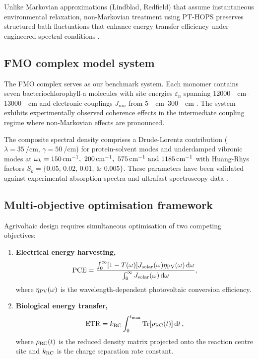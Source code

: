 Unlike Markovian approximations (Lindblad, Redfield) that assume instantaneous environmental relaxation, non-Markovian treatment using PT-HOPS preserves structured bath fluctuations that enhance energy transfer efficiency under engineered spectral conditions \cite{Scholes2011, Huelga2013}.

\subsection{FMO complex model system}

The FMO complex serves as our benchmark system. Each monomer contains seven bacteriochlorophyll-a molecules with site energies $\varepsilon_n$ spanning \SIrange{12000}{13000}{\per\centi\meter} and electronic couplings $J_{nm}$ from \SIrange{5}{300}{\per\centi\meter} \cite{Adolphs2006}. The system exhibits experimentally observed coherence effects \cite{Engel2007} in the intermediate coupling regime where non-Markovian effects are pronounced.

The composite spectral density comprises a Drude-Lorentz contribution ($\lambda = \SI{35}{\per\centi\meter}$, $\gamma = \SI{50}{\per\centi\meter}$) for protein-solvent modes and underdamped vibronic modes at $\omega_k = \SIlist{150;200;575;1185}{\per\centi\meter}$ with Huang-Rhys factors $S_k = \{\numlist{0.05; 0.02; 0.01; 0.005}\}$. These parameters have been validated against experimental absorption spectra and ultrafast spectroscopy data \cite{Adolphs2006, Moix2011}.

\subsection{Multi-objective optimisation framework}

Agrivoltaic design requires simultaneous optimisation of two competing objectives:
\begin{enumerate}
\item \textbf{Electrical energy harvesting,}
\begin{equation}\label{eq:PCE}
\mathrm{PCE} = \frac{\int_0^\infty [1-T(\omega)] J_{\rm solar}(\omega) \eta_{\rm PV}(\omega) \dd{\omega}}{\int_0^\infty J_{\rm solar}(\omega) \dd{\omega}},
\end{equation}
where $\eta_{\rm PV}(\omega)$ is the wavelength-dependent photovoltaic conversion efficiency.

\item \textbf{Biological energy transfer,}
\begin{equation}\label{eq:ETR}
\mathrm{ETR} = k_{\rm RC} \int_0^{t_{\rm max}} \Tr[\vb{\rho}_{\rm RC}(t)] \dd{t},
\end{equation}
where $\vb{\rho}_{\rm RC}(t)$ is the reduced density matrix projected onto the reaction centre site and $k_{\rm RC}$ is the charge separation rate constant.
\end{enumerate}

